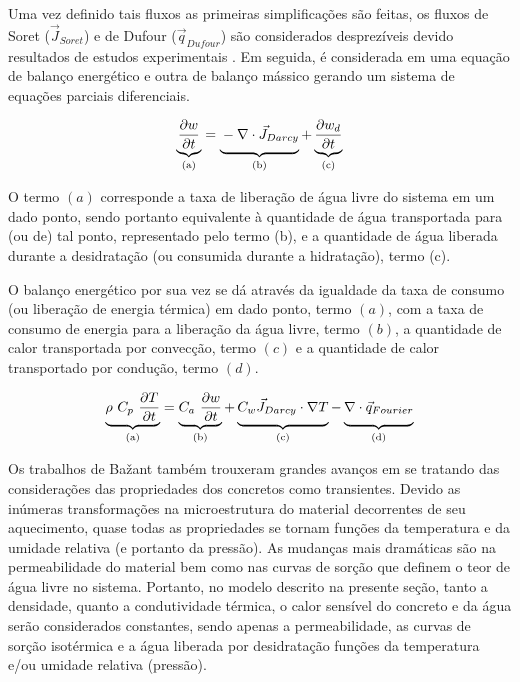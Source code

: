 Uma vez definido tais fluxos as primeiras simplificações são feitas, os fluxos
de Soret ($\vec{J}_{Soret}$) e de Dufour ($\vec{q}_{Dufour}$) são considerados
desprezíveis devido resultados de estudos experimentais \cite{bazant1979}. Em
seguida, é considerada em uma equação de balanço energético e outra de balanço
mássico gerando um sistema de equações parciais diferenciais.

\begin{equation}
  \label{eq:baz_MB}
  \underbrace{\frac{\partial w}{\partial t}}_{\text{(a)}} = \underbrace{\vphantom{ \left(\frac{a}{b}\right) } - \nabla \cdot \vec{J}_{Darcy}}_{\text{(b)}} + \underbrace{\frac{\partial w_d}{\partial t}}_{\text{(c)}}
\end{equation}

O termo $(a)$ corresponde a taxa de liberação de água livre do sistema em um
dado ponto, sendo portanto equivalente à quantidade de água transportada para
(ou de) tal ponto, representado pelo termo (b), e a quantidade de água liberada
durante a desidratação (ou consumida durante a hidratação), termo (c).

O balanço energético por sua vez se dá através da igualdade da taxa de consumo
(ou liberação de energia térmica) em dado ponto, termo $(a)$, com a taxa de
consumo de energia para a liberação da água livre, termo $(b)$, a quantidade de
calor transportada por convecção, termo $(c)$ e a quantidade de calor
transportado por condução, termo $(d)$.

\begin{equation}
  \label{eq:baz_EB}
  \underbrace{\rho \ C_p \ \frac{\partial T}{\partial t}}_{\text{(a)}} = \underbrace{C_a \ \frac{\partial w}{\partial t}}_{\text{(b)}} + \underbrace{\vphantom{\left(\frac{a}{b}\right)} C_w \vec{J}_{Darcy}\cdot \nabla T}_{\text{(c)}} - \underbrace{\vphantom{\left(\frac{a}{b}\right)} \nabla \cdot \vec{q}_{Fourier}}_{\text{(d)}}
\end{equation}
    
Os trabalhos de Ba\v{z}ant também trouxeram grandes avanços em se tratando das
considerações das propriedades dos concretos como transientes. Devido as
inúmeras transformações na microestrutura do material decorrentes de seu
aquecimento, quase todas as propriedades se tornam funções da temperatura e da
umidade relativa (e portanto da pressão). As mudanças mais dramáticas são na
permeabilidade do material bem como nas curvas de sorção que definem o teor de
água livre no sistema. Portanto, no modelo descrito na presente seção, tanto a
densidade, quanto a condutividade térmica, o calor sensível do concreto e da
água serão considerados constantes, sendo apenas a permeabilidade, as curvas de
sorção isotérmica e a água liberada por desidratação funções da temperatura e/ou
umidade relativa (pressão).

